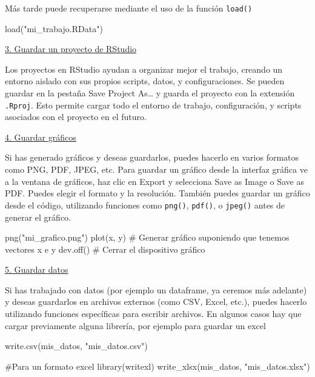 \documentclass[
  letterpaper,
  DIV=11,
  numbers=noendperiod]{scrreprt}
\newenvironment{Shaded}{\begin{snugshade}}{\end{snugshade}}
\newcommand{\CommentTok}[1]{\textcolor[rgb]{0.37,0.37,0.37}{#1}}
\newcommand{\FunctionTok}[1]{\textcolor[rgb]{0.28,0.35,0.67}{#1}}
\newcommand{\NormalTok}[1]{\textcolor[rgb]{0.00,0.23,0.31}{#1}}
\newcommand{\StringTok}[1]{\textcolor[rgb]{0.13,0.47,0.30}{#1}}
\begin{document}
Más tarde puede recuperarse mediante el uso de la función
\texttt{load()}

\begin{Shaded}
\begin{Highlighting}[]
\FunctionTok{load}\NormalTok{(}\StringTok{"mi\_trabajo.RData"}\NormalTok{) }
\end{Highlighting}
\end{Shaded}

\uline{3. Guardar un proyecto de RStudio}

Los proyectos en RStudio ayudan a organizar mejor el trabajo, creando un
entorno aislado con sus propios scripts, datos, y configuraciones. Se
pueden guardar en la pestaña Save Project As\ldots{} y guarda el
proyecto con la extensión \texttt{.Rproj}. Esto permite cargar todo el
entorno de trabajo, configuración, y scripts asociados con el proyecto
en el futuro.

\uline{4. Guardar gráficos}

Si has generado gráficos y deseas guardarlos, puedes hacerlo en varios
formatos como PNG, PDF, JPEG, etc. Para guardar un gráfico desde la
interfaz gráfica ve a la ventana de gráficos, haz clic en Export y
selecciona Save as Image o Save as PDF. Puedes elegir el formato y la
resolución. También puedes guardar un gráfico desde el código,
utilizando funciones como \texttt{png()}, \texttt{pdf()}, o
\texttt{jpeg()} antes de generar el gráfico.

\begin{Shaded}
\begin{Highlighting}[]
\FunctionTok{png}\NormalTok{(}\StringTok{"mi\_grafico.png"}\NormalTok{)}
\FunctionTok{plot}\NormalTok{(x, y)  }\CommentTok{\# Generar gráfico suponiendo que tenemos vectores x e y}
\FunctionTok{dev.off}\NormalTok{()  }\CommentTok{\# Cerrar el dispositivo gráfico}
\end{Highlighting}
\end{Shaded}

\uline{5. Guardar datos}

Si has trabajado con datos (por ejemplo un dataframe, ya ceremos más
adelante) y deseas guardarlos en archivos externos (como CSV, Excel,
etc.), puedes hacerlo utilizando funciones específicas para escribir
archivos. En algunos casos hay que cargar previamente alguna librería,
por ejemplo para guardar un excel

\begin{Shaded}
\begin{Highlighting}[]
\FunctionTok{write.csv}\NormalTok{(mis\_datos, }\StringTok{"mis\_datos.csv"}\NormalTok{) }

\CommentTok{\#Para un formato excel}
\FunctionTok{library}\NormalTok{(writexl) }
\FunctionTok{write\_xlsx}\NormalTok{(mis\_datos, }\StringTok{"mis\_datos.xlsx"}\NormalTok{)}
\end{Highlighting}
\end{Shaded}
\end{document}
